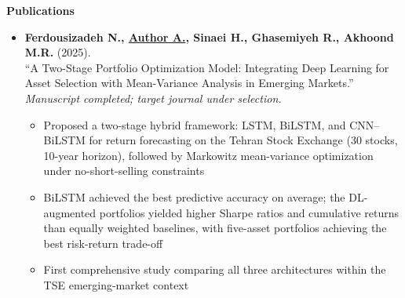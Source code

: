 \documentclass[11pt,a4paper]{article}
\newcommand{\itemspace}{\vspace{0.4em}}
\newcommand{\sectionspace}{\itemspace}
\newcommand{\cvsection}[1]{
    \sectionspace
    \noindent\textcolor{primary}{\Large \textbf{#1}} \textcolor{primary}{\hrulefill}
    \par\vspace{0.4em}
}
\providecommand{\cvauthorcitation}{Author A.}
\begin{document}
\cvsection{Publications}

\begin{itemize}[leftmargin=1em, label={}]
    \item \textbf{Ferdousizadeh N., \underline{\cvauthorcitation}, Sinaei H., Ghasemiyeh R., Akhoond M.R.} (2025). \\
    ``A Two-Stage Portfolio Optimization Model: Integrating Deep Learning for Asset Selection with Mean-Variance Analysis in Emerging Markets.''\\
    \emph{Manuscript completed; target journal under selection.}
    \begin{itemize}[leftmargin=1.5em, label=$\bullet$, nosep]
        \item Proposed a two-stage hybrid framework: LSTM, BiLSTM, and CNN--BiLSTM for return forecasting on the Tehran Stock Exchange (30 stocks, 10-year horizon), followed by Markowitz mean-variance optimization under no-short-selling constraints
        \item BiLSTM achieved the best predictive accuracy on average; the DL-augmented portfolios yielded higher Sharpe ratios and cumulative returns than equally weighted baselines, with five-asset portfolios achieving the best risk-return trade-off
        \item First comprehensive study comparing all three architectures within the TSE emerging-market context
    \end{itemize}
\end{itemize}
\end{document}
